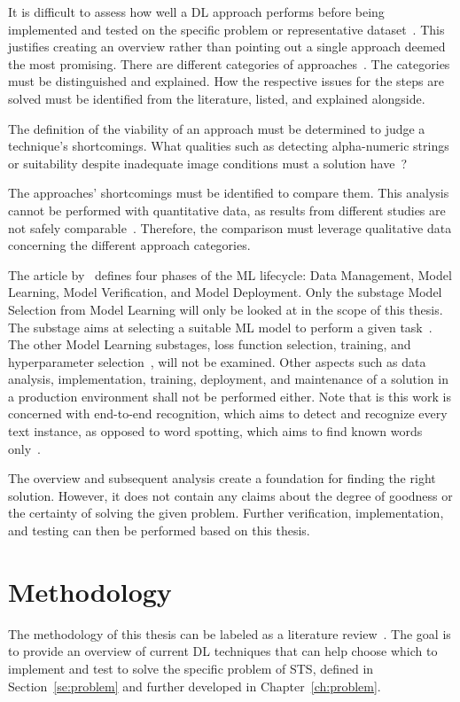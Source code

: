 It is difficult to assess how well a \ac{DL} approach performs before being implemented and tested
on the specific problem or representative dataset~\citep{arpteg_software_2018}.
This justifies creating an overview rather than pointing out a single approach deemed the most
promising.
There are different categories of approaches~\citep{chen_text_2021,long_scene_2021}.
The categories must be distinguished and explained.
How the respective issues for the steps are solved must be
identified from the literature, listed, and explained alongside.

The definition of the viability of an approach must be determined to judge a technique's shortcomings.
What qualities such as detecting alpha-numeric strings or suitability despite
inadequate image conditions must a solution have~\citep{ghosh_visual_2017, hu_gtc_2020}?

The approaches' shortcomings must be identified to compare them.
This analysis cannot be performed with quantitative data, as results from different studies are
not safely comparable~\citep{baek_what_2019,arpteg_software_2018,long_scene_2021}.
Therefore, the comparison must leverage qualitative data concerning the different approach
categories.

The article by~\cite{ashmore_assuring_2021} defines four phases of the \ac{ML} lifecycle:
Data Management, Model Learning, Model Verification, and Model Deployment.
Only the substage Model Selection from Model Learning will only be looked at in the scope of this
thesis.
The substage aims at selecting a suitable \ac{ML} model to perform a given
task~\citep{ashmore_assuring_2021}.
The other Model Learning substages, loss function selection, training, and hyperparameter
selection~\citep{ashmore_assuring_2021}, will not be examined.
Other aspects such as data analysis, implementation, training, deployment, and maintenance of a
solution in a production environment shall not be performed either.
Note that is this work is concerned with end-to-end recognition, which aims to detect and recognize
every text instance, as opposed to word spotting, which aims to find known
words only~\citep{chen_text_2021,karatzas_icdar_2015}.

The overview and subsequent analysis create a foundation for finding the right solution.
However, it does not contain any claims about the degree of goodness or the certainty of
solving the given problem.
Further verification, implementation, and testing can then be performed based on this thesis.

\section{Methodology}\label{se:methodology}
The methodology of this thesis can be labeled as a literature review~\citep{snyder_literature_2019,
torraco_writing_2005}.
The goal is to provide an overview of current \ac{DL} techniques that can help choose
which to implement and test to solve the specific problem of \ac{STS}, defined in
Section~\ref{se:problem} and further developed in Chapter~\ref{ch:problem}.

